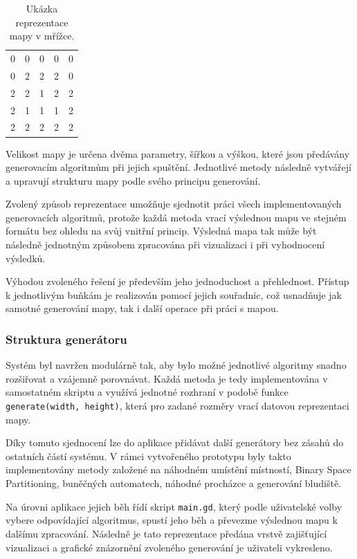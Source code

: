 \documentclass[
  program=itk,
  biblatex,
  figures=false,
  glossaries,
  index
]{kidiplom}
\begin{document}
\begin{table}[h]
\centering
\begin{tabular}{ccccc}
0 & 0 & 0 & 0 & 0 \\
0 & 2 & 2 & 2 & 0 \\
2 & 2 & 1 & 2 & 2 \\
2 & 1 & 1 & 1 & 2 \\
2 & 2 & 2 & 2 & 2 \\
\end{tabular}
\caption{Ukázka reprezentace mapy v mřížce.}
\label{tab:grid_example}
\end{table}

Velikost mapy je určena dvěma parametry, šířkou a výškou, které jsou předávány generovacím algoritmům při jejich spuštění. Jednotlivé metody následně vytvářejí a upravují strukturu mapy podle svého principu generování.

Zvolený způsob reprezentace umožňuje sjednotit práci všech implementovaných generovacích algoritmů, protože každá metoda vrací výslednou mapu ve stejném formátu bez ohledu na svůj vnitřní princip. Výsledná mapa tak může být následně jednotným způsobem zpracována při vizualizaci i při vyhodnocení výsledků.

Výhodou zvoleného řešení je především jeho jednoduchost a přehlednost. Přístup k jednotlivým buňkám je realizován pomocí jejich souřadnic, což usnadňuje jak samotné generování mapy, tak i další operace při práci s mapou.

\subsubsection{Struktura generátoru}

Systém byl navržen modulárně tak, aby bylo možné jednotlivé algoritmy snadno rozšiřovat a vzájemně porovnávat. 
Každá metoda je tedy implementována v samostatném skriptu a využívá jednotné rozhraní v podobě funkce \texttt{generate(width, height)}, která pro zadané rozměry vrací datovou reprezentaci mapy.

Díky tomuto sjednocení lze do aplikace přidávat další generátory bez zásahů do ostatních částí systému. V rámci vytvořeného prototypu byly takto implementovány metody založené na náhodném umístění místností, Binary Space Partitioning, buněčných automatech, náhodné procházce a generování bludiště.

Na úrovni aplikace jejich běh řídí skript \texttt{main.gd}, který podle uživatelské volby vybere odpovídající algoritmus, spustí jeho běh a převezme výslednou mapu k dalšímu zpracování. Následně je tato reprezentace předána vrstvě zajišťující vizualizaci a grafické znázornění zvoleného generování je uživateli vykresleno.
\end{document}
